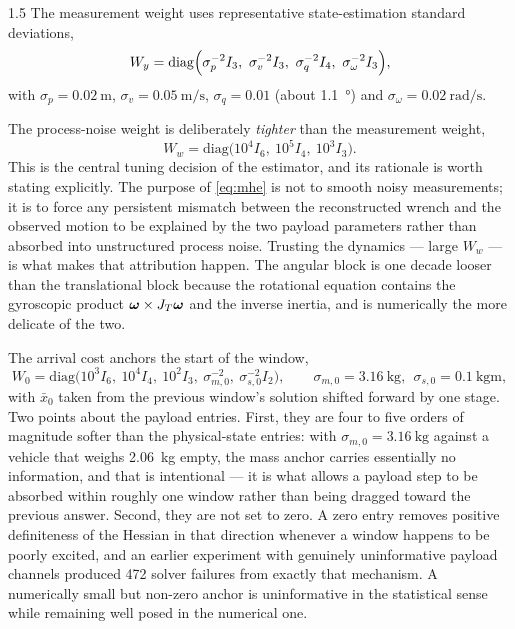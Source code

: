 \begin{spacing}{1.5}
The measurement weight uses representative state-estimation standard deviations,
\begin{equation}
W_y = \mathrm{diag}\Bigl(\sigma_p^{-2}I_3,\ \sigma_v^{-2}I_3,\ \sigma_q^{-2}I_4,\ \sigma_\omega^{-2}I_3\Bigr),
\label{eq:Wy}
\end{equation}
with $\sigma_p=\SI{0.02}{\meter}$, $\sigma_v=\SI{0.05}{\meter\per\second}$,
$\sigma_q=0.01$ (about \SI{1.1}{\degree}) and
$\sigma_\omega=\SI{0.02}{\radian\per\second}$.

The process-noise weight is deliberately \emph{tighter} than the measurement
weight,
\begin{equation}
W_w = \mathrm{diag}\bigl(10^{4} I_6,\ 10^{5} I_4,\ 10^{3} I_3\bigr).
\label{eq:Ww}
\end{equation}
This is the central tuning decision of the estimator, and its rationale is worth
stating explicitly. The purpose of \eqref{eq:mhe} is not to smooth noisy
measurements; it is to force any persistent mismatch between the reconstructed
wrench and the observed motion to be explained by the two payload parameters
rather than absorbed into unstructured process noise. Trusting the dynamics ---
large $W_w$ --- is what makes that attribution happen. The angular block is one
decade looser than the translational block because the rotational equation
contains the gyroscopic product $\bm\omega\times J_T\bm\omega$ and the inverse
inertia, and is numerically the more delicate of the two.

The arrival cost anchors the start of the window,
\begin{equation}
W_0 = \mathrm{diag}\bigl(10^{3} I_6,\ 10^{4} I_4,\ 10^{2} I_3,\ \sigma_{m,0}^{-2},\ \sigma_{s,0}^{-2}I_2\bigr),
\qquad
\sigma_{m,0} = \SI{3.16}{\kg},\ \ \sigma_{s,0}=\SI{0.1}{\kg\meter},
\label{eq:W0}
\end{equation}
with $\bar x_0$ taken from the previous window's solution shifted forward by one
stage. Two points about the payload entries. First, they are four to five orders
of magnitude softer than the physical-state entries: with
$\sigma_{m,0}=\SI{3.16}{\kg}$ against a vehicle that weighs \SI{2.06}{\kg}
empty, the mass anchor carries essentially no information, and that is
intentional --- it is what allows a payload step to be absorbed within roughly
one window rather than being dragged toward the previous answer. Second, they are
not set to zero. A zero entry removes positive definiteness of the Hessian in
that direction whenever a window happens to be poorly excited, and an earlier
experiment with genuinely uninformative payload channels produced 472 solver
failures from exactly that mechanism. A numerically small but non-zero anchor is
uninformative in the statistical sense while remaining well posed in the
numerical one.


\end{spacing}
